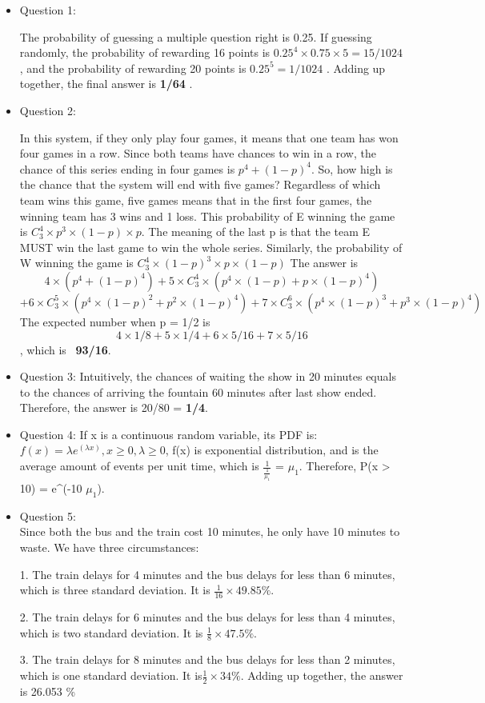 \documentclass{article}
\begin{document}
\begin{itemize}
\item Question 1:  \hfill

The probability of guessing a multiple question right is 0.25. If guessing randomly, the probability of rewarding 16 points is $0.25^4 \times 0.75 \times 5 = 15/1024 $, and the probability of rewarding 20 points is  $0.25^5 = 1/1024 $ . Adding up together, the final answer is \textbf{1/64} .

\item Question 2: \hfill

In this system, if they only play four games, it means that one team has won four games in a row. Since both teams have chances to win in a row, the chance of this series ending in four games is  $p^4 + (1-p)^4$. 
So, how high is the chance that the system will end with five games? Regardless of which team wins this game, five games means that in the first four games, the winning team has 3 wins and 1 loss. This probability of E winning the game is $C^{4}_{3} \times p^3 \times (1-p) \times p$. The meaning of the last p is that the team E MUST win the last game to win the whole series.  Similarly, the probability of W winning the game is  $C^{4}_{3} \times (1-p)^3 \times p \times (1-p)$
The answer is $$ 4 \times (p^4 + (1-p)^4) + 5 \times  C^{4}_{3} \times (p^4 \times (1-p) + p \times (1-p)^4)$$
$$+ 6 \times  C^{5}_{3} \times (p^4 \times (1-p)^2 + p^2 \times (1-p)^4) + 7 \times  C^{6}_{3} \times (p^4 \times (1-p)^3 + p ^3 \times (1-p)^4)$$
The expected number when p = 1/2 is $$4 \times 1/8 + 5 \times 1/4 + 6 \times 5/16 + 7 \times 5/16$$, which is \  \textbf{93/16}.

\item Question 3: \hfill
Intuitively, the chances of waiting the show in 20 minutes equals to the chances of arriving the fountain 60 minutes after last show ended. Therefore, the answer is 20/80 = \textbf{1/4}.

\item Question 4: \hfill
If x is a continuous random variable, its PDF is: $f(x) = \lambda e^(\lambda x), x\ge 0, \lambda \ge 0$, f(x) is exponential distribution, and \lambda is the average amount of events per unit time, which is $\frac{1}{\frac{1}{\mu_1}}$ = $\mu_1$. Therefore, P(x > 10) = e^(-10 \times $\mu_1$). 


\item Question 5: \hfill \\
Since both the bus and the train cost 10 minutes, he only have 10 minutes to waste. We have three circumstances: \\
\item[1.] The train delays for 4 minutes and the bus delays for less than 6 minutes, which is three standard deviation. It is $\frac{1}{16} \times 49.85 \%$.
\item[2.]  The train delays for 6 minutes and the bus delays for less than 4 minutes, which is two standard deviation. It is $\frac{1}{8} \times 47.5 \%$.
\item[3.]  The train delays for 8 minutes and the bus delays for less than 2 minutes, which is one standard deviation. It is$ \frac{1}{2} \times 34 \%$.
Adding up together, the answer is 26.053 \%


\end{itemize}
\end{document}
